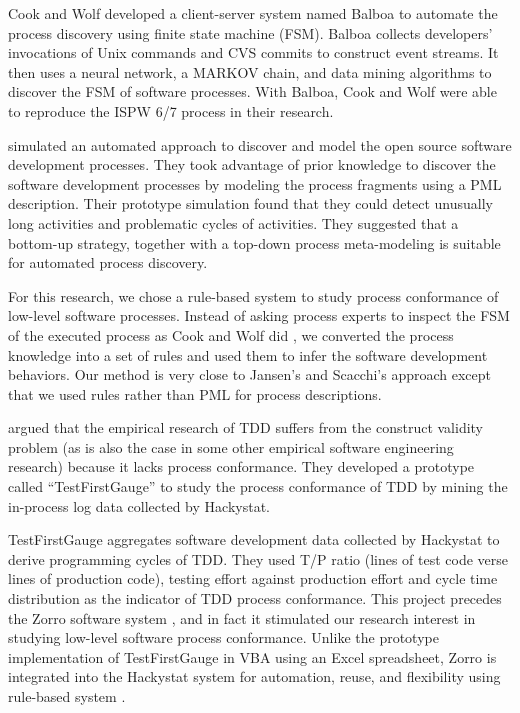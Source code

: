 \documentclass[smallextended]{svjour3}     %
\begin{document}
Cook and Wolf \citep{Cook:95,Cook:96} developed a client-server system
named Balboa to automate the process discovery using finite state machine
(FSM). Balboa collects developers' invocations of Unix commands and CVS
commits to construct event streams. It then uses a neural network, a MARKOV
chain, and data mining algorithms to discover the FSM of software
processes. With Balboa, Cook and Wolf were able to reproduce the ISPW 6/7
process in their research.

\cite{Jensen:04,Jensen:05} simulated an automated approach to discover and
model the open source software development processes. They took advantage
of prior knowledge to discover the software development processes by
modeling the process fragments using a PML description. Their prototype
simulation found that they could detect unusually long activities and
problematic cycles of activities. They suggested that a bottom-up strategy,
together with a top-down process meta-modeling is suitable for automated
process discovery. 

For this research, we chose a rule-based system to study process
conformance of low-level software processes. Instead of asking process
experts to inspect the FSM of the executed process as Cook and Wolf did
\citep{Cook:95}, we converted the process knowledge into a set of rules and
used them to infer the software development behaviors. Our method is very
close to Jansen's and Scacchi's approach \citep{Jensen:04} except that we
used rules rather than PML for process descriptions.

\cite{Wang:04} argued that the empirical research of TDD suffers from the
construct validity problem (as is also the case in some other empirical
software engineering research) because it lacks process conformance. They
developed a prototype called ``TestFirstGauge'' to study the process
conformance of TDD by mining the in-process log data collected by
Hackystat.

TestFirstGauge aggregates software development data collected
by Hackystat to derive programming cycles of TDD. They used T/P ratio 
(lines of test code verse lines of production code), testing effort 
against production effort and cycle time distribution as the indicator 
of TDD process conformance. This project precedes the Zorro software 
system \citep{csdl2-06-02}, and in fact it stimulated our research interest 
in studying low-level software process conformance. Unlike the
prototype implementation of TestFirstGauge in VBA using an Excel
spreadsheet, Zorro is integrated into the Hackystat system for automation,
reuse, and flexibility using rule-based system \citep{Friedman-Hill:03}.
\end{document}
